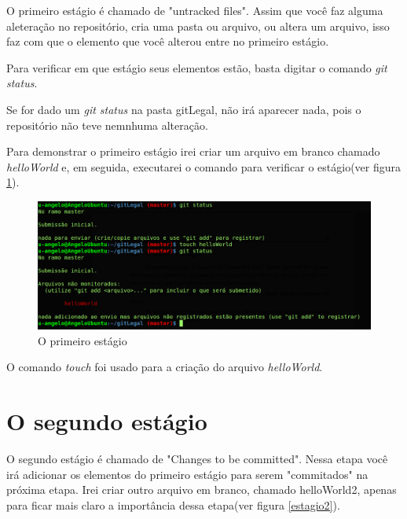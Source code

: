 \documentclass[12pt,openright,oneside,a4paper,english,brazil]{abntex2}
\begin{document}
O primeiro estágio é chamado de "untracked files". Assim que você faz alguma aleteração no repositório, cria uma pasta ou arquivo, ou altera um arquivo, isso faz com que o elemento que você alterou entre no primeiro estágio.

Para verificar em que estágio seus elementos estão, basta digitar o comando \textit{git status}.

Se for dado um \textit{git status} na pasta gitLegal, não irá aparecer nada, pois o repositório não teve nemnhuma alteração. 

Para demonstrar o primeiro estágio irei criar um arquivo em branco chamado \textit{helloWorld} e, em seguida, executarei o comando para verificar o estágio(ver figura \ref{estagio1}).

\begin{figure}[h]
	\caption{\label{estagio1}O primeiro estágio}
	\begin{center}
		\includegraphics[width=1\linewidth]{estagio1}
	\end{center}
\end{figure}

O comando \textit{touch} foi usado para a criação do arquivo \textit{helloWorld}.

\section{O segundo estágio}

O segundo estágio é chamado de "Changes to be committed". Nessa etapa você irá adicionar os elementos do primeiro estágio para serem "commitados" na próxima etapa. Irei criar outro arquivo em branco, chamado helloWorld2, apenas para ficar mais claro a importância dessa etapa(ver figura \ref{estagio2}).
\end{document}
